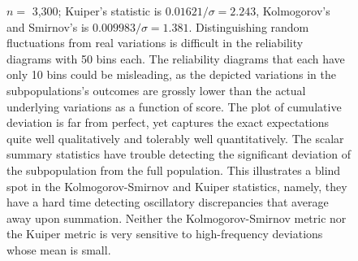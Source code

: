 \documentclass{article}
\begin{document}
\begin{figure}
\begin{centering}
\end{centering}
\caption{$n =$ 3,300;
         Kuiper's statistic is $0.01621 / \sigma = 2.243$,
         Kolmogorov's and Smirnov's is $0.009983 / \sigma = 1.381$.
Distinguishing random fluctuations from real variations
is difficult in the reliability diagrams with 50 bins each.
The reliability diagrams that each have only 10 bins could be misleading,
as the depicted variations in the subpopulations's outcomes are grossly
lower than the actual underlying variations as a function of score.
The plot of cumulative deviation is far from perfect, yet captures
the exact expectations quite well qualitatively
and tolerably well quantitatively.
The scalar summary statistics have trouble
detecting the significant deviation of the subpopulation
from the full population.
This illustrates a blind spot in the Kolmogorov-Smirnov and Kuiper statistics,
namely, they have a hard time detecting oscillatory discrepancies
that average away upon summation. Neither the Kolmogorov-Smirnov metric
nor the Kuiper metric is very sensitive to high-frequency deviations
whose mean is small.
}
\label{3300}
\end{figure}
\end{document}
